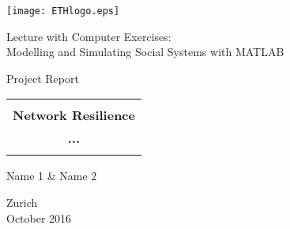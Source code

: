 
\thispagestyle{empty}

\begin{center}
\texttt{[image: ETHlogo.eps]}

\bigskip


\bigskip


\bigskip


\LARGE{ 	Lecture with Computer Exercises:\\ }
\LARGE{ Modelling and Simulating Social Systems with MATLAB\\}

\bigskip

\bigskip

\small{Project Report}\\

\bigskip

\bigskip

\bigskip

\bigskip


\begin{tabular}{|c|}
\hline
\\
\textbf{\LARGE{Network Resilience}}\\
\textbf{\LARGE{...}}\\
\\
\hline
\end{tabular}
\bigskip

\bigskip

\bigskip

\LARGE{Name 1 \& Name 2}



\bigskip

\bigskip

\bigskip

\bigskip

\bigskip

\bigskip

\bigskip

\bigskip

Zurich\\
October 2016\\

\end{center}


